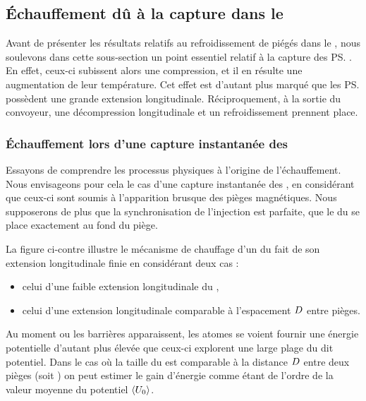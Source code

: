 \subsection{Échauffement dû à la capture dans le \tp}\label{sec:EchauffCaptureConv}
Avant de présenter les résultats relatifs au refroidissement de \pats piégés dans le \tpIP, nous soulevons dans cette sous-section un point essentiel relatif à la capture des \ps.  
En effet, ceux-ci subissent alors une compression, et il en résulte une augmentation de leur température. Cet effet est d'autant plus marqué que les \ps possèdent une grande extension longitudinale.
Réciproquement, à la sortie du convoyeur, une décompression longitudinale et un refroidissement prennent place. 


\subsubsection{Échauffement lors d'une capture instantanée des \pats}
Essayons de comprendre les processus physiques à l'origine de l'échauffement. Nous envisageons pour cela le cas d'une capture instantanée des \pats, \cad en considérant que ceux-ci sont soumis à l'apparition brusque des pièges magnétiques. Nous supposerons de plus que la synchronisation de l'injection est parfaite, \cad que le \cdm du \p se place exactement au fond du piège. 
\noindent \begin{minipage}{9.3cm}
\noindent La figure ci-contre illustre le mécanisme de chauffage d'un \pat du fait de son extension longitudinale finie en considérant deux cas :
\begin{itemize}
	\item celui d'une faible extension longitudinale du \p, 
	\item celui d'une extension longitudinale comparable à l'espacement ${D}$ entre pièges. 
\end{itemize}
Au moment ou les barrières apparaissent, les atomes se voient fournir une énergie potentielle d'autant plus élevée que ceux-ci explorent une large plage du dit potentiel. Dans le cas où la taille du \p est comparable à la distance ${D}$ entre deux pièges (soit ) on peut estimer le gain d'énergie comme étant de l'ordre de la valeur moyenne du potentiel $\left\langle {U_{0}} \right\rangle$. 
\end{minipage}
\vspace{0.1cm}

